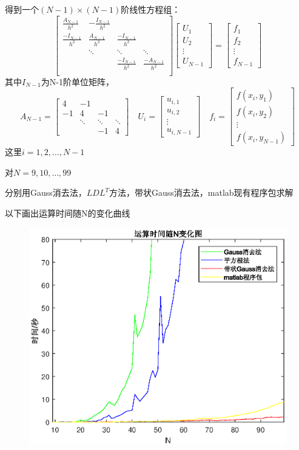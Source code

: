 \documentclass[withoutpreface,bwprint]{cumcmthesis}
\begin{document}
得到一个$(N-1)\times(N-1)$阶线性方程组：
\begin{equation}
\begin{bmatrix}
\frac{A_{N-1}}{h^2} & -\frac{I_{N-1}}{h^2}&       &       \\
\frac{-I_{N-1}}{h^2} & \frac{A_{N-1}}{h^2}&\frac{-I_{N-1}}{h^2}&        \\
        & \ddots &\ddots &\ddots \\
        &        &\frac{-I_{N-1}}{h^2}&\frac{-A_{N-1}}{h^2} \\
\end{bmatrix}
\begin{bmatrix}
U_1\\
U_2\\
\vdots\\
U_{N-1}
\end{bmatrix}
=
\begin{bmatrix}
f_1\\
f_2\\
\vdots\\
f_{N-1}
\end{bmatrix}
\end{equation}
其中$I_{N-1}$为N-1阶单位矩阵，
\begin{equation}
A_{N-1}=
\begin{bmatrix}
4 & -1     &  &  \\
-1 & 4     &-1 &\\
  & \ddots&\ddots&\ddots\\
  &       & -1 & 4
\end{bmatrix}
\quad U_i=
\begin{bmatrix}
u_{i,1}\\
u_{i,2}\\
\vdots\\
u_{i,N-1}
\end{bmatrix}
\quad f_i=
\begin{bmatrix}
f(x_i,y_1)\\
f(x_i,y_2)\\
\vdots\\
f(x_i,y_{N-1})
\end{bmatrix}
\end{equation}
这里$i=1,2,\dots,N-1$

对$N=9,10,\dots,99$

分别用Gauss消去法，$LDL^T$方法，带状Gauss消去法，matlab现有程序包求解

以下画出运算时间随N的变化曲线

\begin{figure}[!h]
\centering\includegraphics[width=.6\textwidth]{计算时间.eps}
\end{figure}
\end{document}
